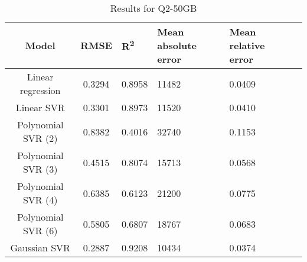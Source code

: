 \begin{table}[H]
\centering
\begin{adjustbox}{center}
\begin{tabular}{c | c M{1.2cm} M{2.5cm} M{2.5cm} M{1.8cm}}
Model & RMSE & R\textsuperscript{2} & Mean absolute error & Mean relative error \tabularnewline
\hline
Linear regression & 0.3294 & 0.8958 &  11482 & 0.0409 \\
Linear SVR & 0.3301 & 0.8973 &  11520 & 0.0410 \\
Polynomial SVR (2) & 0.8382 & 0.4016 &  32740 & 0.1153 \\
Polynomial SVR (3) & 0.4515 & 0.8074 &  15713 & 0.0568 \\
Polynomial SVR (4) & 0.6385 & 0.6123 &  21200 & 0.0775 \\
Polynomial SVR (6) & 0.5805 & 0.6807 &  18767 & 0.0683 \\
Gaussian SVR & 0.2887 & 0.9208 &  10434 & 0.0374 \\
\end{tabular}
\end{adjustbox}
\\
\caption{Results for Q2-50GB}
\label{tab:all_linear_Q2_50}
\end{table}
